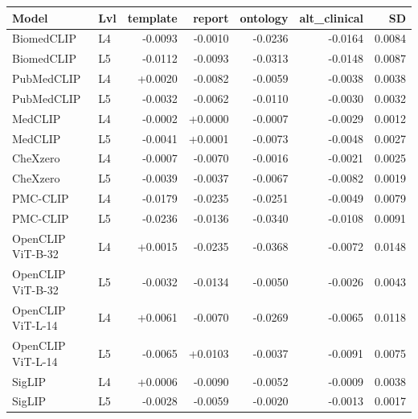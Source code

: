\begin{tabular}{llrrrrr}
\toprule
Model & Lvl & template & report & ontology & alt_clinical & SD \\
\midrule
BiomedCLIP & L4 & -0.0093 & -0.0010 & -0.0236 & -0.0164 & 0.0084 \\
BiomedCLIP & L5 & -0.0112 & -0.0093 & -0.0313 & -0.0148 & 0.0087 \\
PubMedCLIP & L4 & +0.0020 & -0.0082 & -0.0059 & -0.0038 & 0.0038 \\
PubMedCLIP & L5 & -0.0032 & -0.0062 & -0.0110 & -0.0030 & 0.0032 \\
MedCLIP & L4 & -0.0002 & +0.0000 & -0.0007 & -0.0029 & 0.0012 \\
MedCLIP & L5 & -0.0041 & +0.0001 & -0.0073 & -0.0048 & 0.0027 \\
CheXzero & L4 & -0.0007 & -0.0070 & -0.0016 & -0.0021 & 0.0025 \\
CheXzero & L5 & -0.0039 & -0.0037 & -0.0067 & -0.0082 & 0.0019 \\
PMC-CLIP & L4 & -0.0179 & -0.0235 & -0.0251 & -0.0049 & 0.0079 \\
PMC-CLIP & L5 & -0.0236 & -0.0136 & -0.0340 & -0.0108 & 0.0091 \\
OpenCLIP ViT-B-32 & L4 & +0.0015 & -0.0235 & -0.0368 & -0.0072 & 0.0148 \\
OpenCLIP ViT-B-32 & L5 & -0.0032 & -0.0134 & -0.0050 & -0.0026 & 0.0043 \\
OpenCLIP ViT-L-14 & L4 & +0.0061 & -0.0070 & -0.0269 & -0.0065 & 0.0118 \\
OpenCLIP ViT-L-14 & L5 & -0.0065 & +0.0103 & -0.0037 & -0.0091 & 0.0075 \\
SigLIP & L4 & +0.0006 & -0.0090 & -0.0052 & -0.0009 & 0.0038 \\
SigLIP & L5 & -0.0028 & -0.0059 & -0.0020 & -0.0013 & 0.0017 \\
\bottomrule
\end{tabular}
